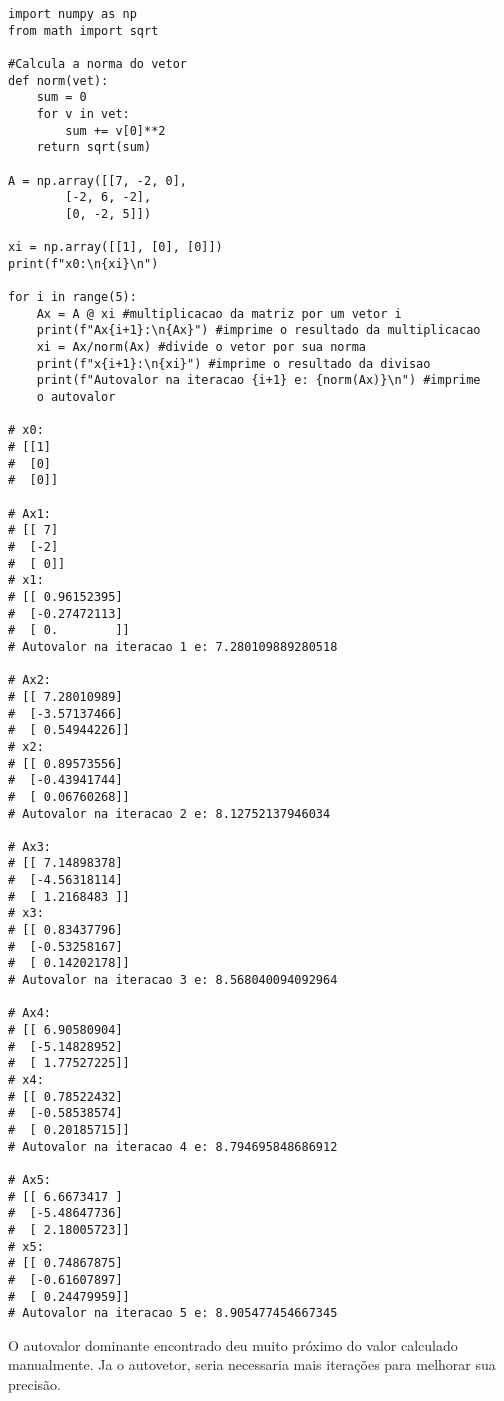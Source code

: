 \begin{lstlisting}
import numpy as np
from math import sqrt

#Calcula a norma do vetor
def norm(vet):
    sum = 0
    for v in vet:
        sum += v[0]**2
    return sqrt(sum)

A = np.array([[7, -2, 0],
        [-2, 6, -2],
        [0, -2, 5]])

xi = np.array([[1], [0], [0]])
print(f"x0:\n{xi}\n")

for i in range(5):
    Ax = A @ xi #multiplicacao da matriz por um vetor i
    print(f"Ax{i+1}:\n{Ax}") #imprime o resultado da multiplicacao
    xi = Ax/norm(Ax) #divide o vetor por sua norma
    print(f"x{i+1}:\n{xi}") #imprime o resultado da divisao
    print(f"Autovalor na iteracao {i+1} e: {norm(Ax)}\n") #imprime 
    o autovalor

# x0:
# [[1]
#  [0]
#  [0]]

# Ax1:
# [[ 7]
#  [-2]
#  [ 0]]
# x1:
# [[ 0.96152395]
#  [-0.27472113]
#  [ 0.        ]]
# Autovalor na iteracao 1 e: 7.280109889280518

# Ax2:
# [[ 7.28010989]
#  [-3.57137466]
#  [ 0.54944226]]
# x2:
# [[ 0.89573556]
#  [-0.43941744]
#  [ 0.06760268]]
# Autovalor na iteracao 2 e: 8.12752137946034

# Ax3:
# [[ 7.14898378]
#  [-4.56318114]
#  [ 1.2168483 ]]
# x3:
# [[ 0.83437796]
#  [-0.53258167]
#  [ 0.14202178]]
# Autovalor na iteracao 3 e: 8.568040094092964

# Ax4:
# [[ 6.90580904]
#  [-5.14828952]
#  [ 1.77527225]]
# x4:
# [[ 0.78522432]
#  [-0.58538574]
#  [ 0.20185715]]
# Autovalor na iteracao 4 e: 8.794695848686912

# Ax5:
# [[ 6.6673417 ]
#  [-5.48647736]
#  [ 2.18005723]]
# x5:
# [[ 0.74867875]
#  [-0.61607897]
#  [ 0.24479959]]
# Autovalor na iteracao 5 e: 8.905477454667345
\end{lstlisting}

O autovalor dominante encontrado deu muito próximo do valor calculado manualmente. Ja o autovetor, seria necessaria mais iterações para melhorar sua precisão.\\

